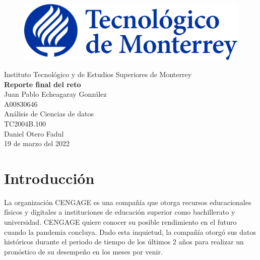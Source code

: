\documentclass{article}
\begin{document}
    \begin{titlepage}
        \begin{center}
            \begin{figure}
                \centering
                \includegraphics[scale=0.13]{img/logo_itesm.png}\\ %
            \end{figure}
        \vspace{5cm}
        \LARGE{Instituto Tecnológico y de Estudios Superiores de Monterrey}\\
        \fontsize{12}{14}\selectfont
        \vspace{1cm}
        \textbf{Reporte final del reto}\\ %
        \vspace{0.7cm}
        Juan Pablo Echeagaray González\\ %
        \vspace{0.2cm}
        A00830646\\ %
        \vspace{0.7cm}
        Análisis de Ciencias de datos\\ %
        \vspace{0.2cm}
        TC2004B.100\\ %
        \vspace{0.2cm}
        Daniel Otero Fadul\\ %
        \vspace{0.7cm}
        19 de marzo del 2022\\ %
        \end{center}
    \end{titlepage}

    \section{Introducción}
        La organización CENGAGE es una compañía que otorga recursos educacionales físicos y digitales a instituciones de educación superior como bachillerato y universidad. CENGAGE quiere conocer su posible rendimiento en el futuro cuando la pandemia concluya. Dado esta inquietud, la compañía otorgó sus datos históricos durante el periodo de tiempo de los últimos 2 años para realizar un pronóstico de su desempeño en los meses por venir.
\end{document}
